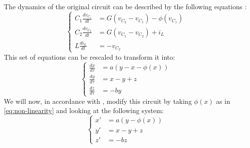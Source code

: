 The dynamics of the original circuit can be described by the following
equations \cite[eq. (1.1)]{Matsumoto85}:
\begin{equation}
  \label{eq:dynamics}
  \left\{
    \begin{aligned}
      C_1\frac{dv_{C_1}}{dt} &= G(v_{C_2}-v_{C_1})-\phi(v_{C_1})\\
      C_2\frac{dv_{C_2}}{dt} &= G(v_{C_1}-v_{C_2}) + i_L\\
      L \frac{di_L}{dt} &= -v_{C_2}
    \end{aligned}
  \right.
\end{equation}
This set of equations can be rescaled to transform it into:
\begin{equation}
  \label{eq:rescaling}
  \left\{
    \begin{aligned}
      \frac{dx}{d\tau} &= a(y-x-\phi(x))\\
      \frac{dy}{d\tau} &= x - y + z\\
      \frac{dz}{d\tau} &= -b y
    \end{aligned}
  \right.
\end{equation}
We will now, in accordance with \cite{hirsch12}, modify this circuit
by taking $\phi(x)$ as in \ref{eq:non-linearity} and looking at the
following system:
\begin{equation}
  \label{eq:modified-system}
  \left\{
    \begin{aligned}
      x' &= a(y-\phi(x))\\
      y' &= x-y+z\\
      z' &= -bz
    \end{aligned}
  \right.
\end{equation}
